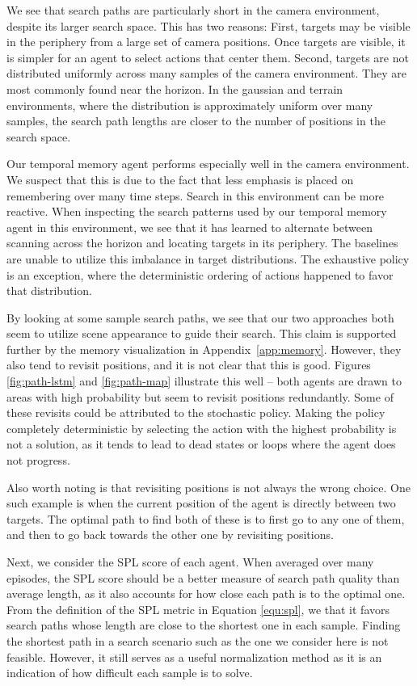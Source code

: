 We see that search paths are particularly short in the camera environment,
despite its larger search space.
This has two reasons:
First, targets may be visible in the periphery from a large set of camera positions.
Once targets are visible, it is simpler for an agent to select actions that center them.
Second, targets are not distributed uniformly across many samples of the camera environment.
They are most commonly found near the horizon.
In the gaussian and terrain environments, where the distribution is approximately uniform over many samples, the search path lengths are closer to the number of positions in the search space.

Our temporal memory agent performs especially well in the camera environment.
We suspect that this is due to the fact that less emphasis is placed on remembering over many time steps.
Search in this environment can be more reactive.
When inspecting the search patterns used by our temporal memory agent in this environment, we see that it has learned to alternate between scanning across the horizon and locating targets in its periphery.
The baselines are unable to utilize this imbalance in target distributions.
The exhaustive policy is an exception, where the deterministic ordering of actions happened to favor that distribution. 

By looking at some sample search paths, we see that our two approaches both seem to utilize scene appearance to guide their search.
This claim is supported further by the memory visualization in Appendix~\ref{app:memory}.
However, they also tend to revisit positions, and it is not clear that this is good.
Figures \ref{fig:path-lstm} and \ref{fig:path-map} illustrate this well --
both agents are drawn to areas with high probability but seem to revisit positions redundantly.
Some of these revisits could be attributed to the stochastic policy.
Making the policy completely deterministic by selecting the action with the highest probability is not a solution, as it tends to lead to dead states or loops where the agent does not progress.

Also worth noting is that revisiting positions is not always the wrong choice.
One such example is when the current position of the agent is directly between two targets.
The optimal path to find both of these is to first go to any one of them, and then to go back towards the other one by revisiting positions.

Next, we consider the SPL score of each agent.
When averaged over many episodes, the SPL score should be a better measure of search path quality than average length, as it also accounts for how close each path is to the optimal one.
From the definition of the SPL metric in Equation \ref{equ:spl}, we that it favors search paths whose length are close to the shortest one in each sample.
Finding the shortest path in a search scenario such as the one we consider here is not feasible.
However, it still serves as a useful normalization method as it is an indication of how difficult each sample is to solve.

